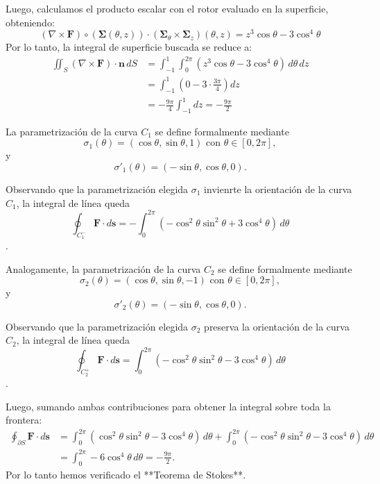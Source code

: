 Luego, calculamos el producto escalar con el rotor evaluado en la superficie, obteniendo:
\[
(\nabla \times \mathbf{F})\circ (\boldsymbol{\Sigma}(\theta, z)) \cdot (\boldsymbol{\Sigma}_{\theta} \times \boldsymbol{\Sigma}_z)(\theta, z) = z^3\cos\theta - 3\cos^4\theta
\]
Por lo tanto, la integral de superficie buscada se reduce a:
\begin{align*}
\iint_{S} (\nabla \times \mathbf{F}) \cdot \mathbf{n}\, dS &= \int_{-1}^{1} \int_{0}^{2\pi} (z^3\cos\theta - 3\cos^4\theta) \, d\theta \, dz \\
&= \int_{-1}^{1} \left( 0 - 3 \cdot \frac{3\pi}{4} \right) dz \\
&= -\frac{9\pi}{4} \int_{-1}^{1} dz = -\frac{9\pi}{2}
\end{align*}





La parametrización de la curva \(C_{1}\) se define formalmente mediante$$ \sigma_1(\theta) = (\cos\theta, \sin\theta, 1) \mbox{ con }  \theta \in [ 0,2\pi], $$ y  $$\sigma'_1(\theta) = (-\sin\theta, \cos\theta, 0).$$

Observando que la parametrizaci\'on  elegida $ \sigma_1$ invienrte la orientaci\'on de la curva $ C_1$, la integral de línea  queda  $$ \oint_{C_1^{-}} \mathbf{F} \cdot d\mathbf{s} =  -\int_{0}^{2\pi} (-\cos^2\theta\sin^2\theta + 3\cos^4\theta) \, d\theta$$.

\smallskip
Analogamente,  la parametrización de la curva \(C_{2}\) se define formalmente mediante \[ \sigma_2(\theta) = (\cos\theta, \sin\theta, -1) \text{ con }  \theta \in  [ 0,2\pi], \] y   
\[\sigma'_2(\theta) = (-\sin\theta, \cos\theta, 0).\] 
	
Observando que la parametrizaci\'on  elegida $ \sigma_2$ preserva la orientaci\'on de la curva $ C_2$, la integral de línea  queda  \[ \oint_{C^{+}_2} \mathbf{F} \cdot d\mathbf{s} =  \int_{0}^{2\pi} (-\cos^2\theta\sin^2\theta - 3\cos^4\theta) \, d\theta \].

\smallskip
Luego, sumando ambas contribuciones para obtener la integral sobre toda la frontera:
\begin{align*}
\oint_{\partial S} \mathbf{F} \cdot d\mathbf{s} &= \int_{0}^{2\pi} (\cos^2\theta\sin^2\theta - 3\cos^4\theta) \, d\theta +  \int_{0}^{2\pi} (-\cos^2\theta\sin^2\theta - 3\cos^4\theta) \, d\theta \\[1ex]
&= \int_{0}^{2\pi} -6\cos^4\theta \, d\theta = -\frac{9\pi}{2}. 
\end{align*} Por lo tanto hemos verificado el **Teorema de Stokes**.




